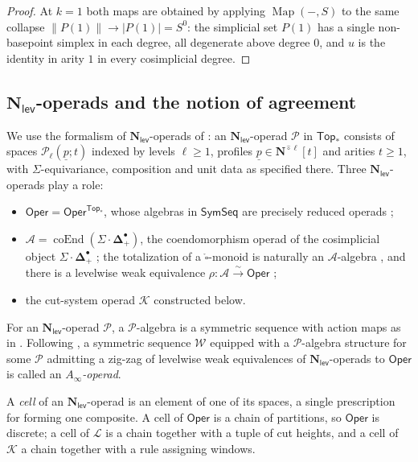 \documentclass[12pt]{amsart}
\theoremstyle{definition}
\theoremstyle{remark}
\newcommand{\Top}{\mathsf{Top}_*}
\newcommand{\SymSeq}{\mathsf{SymSeq}}
\newcommand{\Oper}{\mathsf{Oper}}
\newcommand{\Map}{\operatorname{Map}}
\newcommand{\Cal}[1]{\mathcal{#1}}
\newcommand{\Ncirc}[1]{\mathbf{N}^{\hat{\circ}#1}}
\newcommand{\boxcirc}{\mathring{\square}}
\newcommand{\Nl}{\mathbf{N}_{\mathsf{lev}}}
\newcommand{\SD}{\Sigma{\cdot}\mathbf{\Delta}}
\newcommand{\Kop}{\mathcal{K}}                   %
\newcommand{\Lop}{\mathcal{L}}                   %
\newcommand{\Aop}{\mathcal{A}}                   %
\newcommand{\coEnd}{\operatorname{coEnd}}
\newcommand{\fat}[1]{\lVert #1 \rVert}           %
\begin{document}
\begin{proof}
At $k = 1$ both maps are obtained by applying $\Map(-,S)$ to the same collapse $\fat{P(1)}\to |P(1)| = S^0$: the simplicial set $P(1)$ has a single non-basepoint simplex in each degree, all degenerate above degree $0$, and $u$ is the identity in arity $1$ in every cosimplicial degree.
\end{proof}


\subsection{\texorpdfstring{$\Nl$}{N-lev}-operads and the notion of agreement}\label{sec:Nlev}
We use the formalism of $\Nl$-operads of \cite[\S\S 6--7]{Clark-1}: an $\Nl$-operad $\Cal{P}$ in $\Top$ consists of spaces $\Cal{P}_{\ell}(\underline{p}; t)$ indexed by levels $\ell\geq 1$, profiles $\underline{p}\in \Ncirc{\ell}[t]$ and arities $t\geq 1$, with $\Sigma$-equivariance, composition and unit data as specified there. Three $\Nl$-operads play a role:
\begin{itemize}[leftmargin=2em]
    \item $\Oper = \Oper^{\Top}$, whose algebras in $\SymSeq$ are precisely reduced operads \cite[Definition 7.2, Proposition 7.12]{Clark-1};
    \item $\Aop = \coEnd(\SD^{\bullet}_{+})$, the coendomorphism operad of the cosimplicial object $\SD^{\bullet}_+$ \cite[Definition 7.7, Remark 7.17]{Clark-1}; the totalization of a $\boxcirc$-monoid is naturally an $\Aop$-algebra \cite[\S 8.1]{Clark-1}, and there is a levelwise weak equivalence $\rho\colon \Aop \xrightarrow{\ \sim\ } \Oper$ \cite[Proposition 7.16]{Clark-1};
    \item the cut-system operad $\Kop$ constructed below.
\end{itemize}
For an $\Nl$-operad $\Cal{P}$, a $\Cal{P}$-algebra is a symmetric sequence with action maps as in \cite[Definition 6.32]{Clark-1}. Following \cite[Definition 6.38]{Clark-1}, a symmetric sequence $\Cal{W}$ equipped with a $\Cal{P}$-algebra structure for some $\Cal{P}$ admitting a zig-zag of levelwise weak equivalences of $\Nl$-operads to $\Oper$ is called an \emph{$A_\infty$-operad}.

A \emph{cell} of an $\Nl$-operad is an element of one of its spaces, a single prescription for forming one composite. A cell of $\Oper$ is a chain of partitions, so $\Oper$ is discrete; a cell of $\Lop$ is a chain together with a tuple of cut heights, and a cell of $\Kop$ a chain together with a rule assigning windows.
\end{document}
